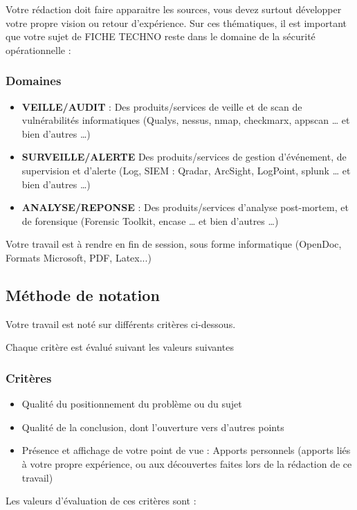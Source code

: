 Votre rédaction doit faire apparaitre les sources, vous devez surtout développer votre propre vision ou retour d'expérience.
Sur ces thématiques, il est important que votre sujet de FICHE TECHNO reste dans le domaine de la sécurité opérationnelle :

\begin{frame}
\frametitle<presentation>{Domaines}
\begin{itemize}
  \item \textbf{VEILLE/AUDIT} : Des produits/services de veille et de scan de vulnérabilités informatiques (Qualys, nessus, nmap, checkmarx, appscan … et bien d’autres …) 
  \item \textbf{SURVEILLE/ALERTE} Des produits/services de gestion d’événement, de supervision et d’alerte (Log, SIEM : Qradar, ArcSight, LogPoint, splunk … et bien d’autres …)
  \item \textbf{ANALYSE/REPONSE} : Des produits/services d’analyse post-mortem, et de forensique (Forensic Toolkit, encase … et bien d’autres …)
\end{itemize}

\end{frame}

Votre travail est à rendre en fin de session, sous forme informatique (OpenDoc, Formats Microsoft, PDF, Latex...)

\subsection{Méthode de notation}

Votre travail est noté sur différents critères ci-dessous.

Chaque critère est évalué suivant les valeurs suivantes

\begin{frame}
\frametitle<presentation>{Critères}

\begin{itemize}
  \item Qualité du positionnement du problème ou du sujet
  \item Qualité de la conclusion, dont l'ouverture vers d'autres points
  \item Présence et affichage de votre point de vue : Apports personnels (apports liés à votre propre expérience, ou aux découvertes  faites lors de la rédaction de ce travail)
\end{itemize}

\end{frame}
Les valeurs d'évaluation de ces critères sont :


